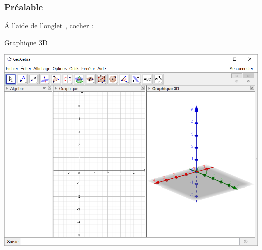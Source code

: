 \documentclass{article}
\begin{document}
\begin{titre}

\end{titre}



\subsubsection{Préalable}

\begin{minipage}{0.48\linewidth}
\'A l'aide de l'onglet , cocher :

\begin{description}
\item[Graphique 3D]
\end{description}

\includegraphics[scale=0.3]{atelier6.png} 

\end{minipage}
\hfill
\end{document}
